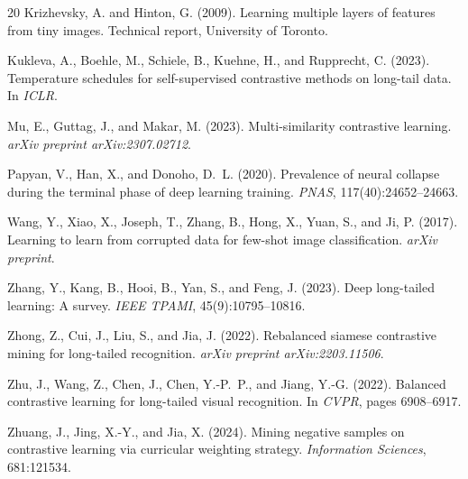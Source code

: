 \documentclass{article}
\begin{document}
\begin{thebibliography}{20}
Krizhevsky, A. and Hinton, G. (2009).
\newblock Learning multiple layers of features from tiny images.
\newblock Technical report, University of Toronto.

Kukleva, A., Boehle, M., Schiele, B., Kuehne, H., and Rupprecht, C. (2023).
\newblock Temperature schedules for self-supervised contrastive methods on long-tail data.
\newblock In \emph{ICLR}.

Mu, E., Guttag, J., and Makar, M. (2023).
\newblock Multi-similarity contrastive learning.
\newblock \emph{arXiv preprint arXiv:2307.02712}.

Papyan, V., Han, X., and Donoho, D.~L. (2020).
\newblock Prevalence of neural collapse during the terminal phase of deep learning training.
\newblock \emph{PNAS}, 117(40):24652--24663.

Wang, Y., Xiao, X., Joseph, T., Zhang, B., Hong, X., Yuan, S., and Ji, P. (2017).
\newblock Learning to learn from corrupted data for few-shot image classification.
\newblock \emph{arXiv preprint}.

Zhang, Y., Kang, B., Hooi, B., Yan, S., and Feng, J. (2023).
\newblock Deep long-tailed learning: A survey.
\newblock \emph{IEEE TPAMI}, 45(9):10795--10816.

Zhong, Z., Cui, J., Liu, S., and Jia, J. (2022).
\newblock Rebalanced siamese contrastive mining for long-tailed recognition.
\newblock \emph{arXiv preprint arXiv:2203.11506}.

Zhu, J., Wang, Z., Chen, J., Chen, Y.-P.~P., and Jiang, Y.-G. (2022).
\newblock Balanced contrastive learning for long-tailed visual recognition.
\newblock In \emph{CVPR}, pages 6908--6917.

Zhuang, J., Jing, X.-Y., and Jia, X. (2024).
\newblock Mining negative samples on contrastive learning via curricular weighting strategy.
\newblock \emph{Information Sciences}, 681:121534.

\end{thebibliography}
\end{document}
